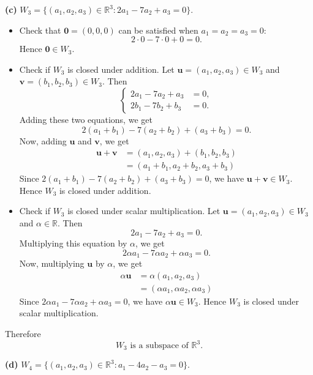 \documentclass{article}
\begin{document}
\bigskip

\noindent
\textbf{(c)} $W_3 = \{(a_1,a_2,a_3) \in \mathbb{R}^3 : 2a_1 - 7a_2 + a_3 = 0\}$.

\begin{itemize}
\item Check that $\mathbf{0} = (0,0,0)$ can be satisfied when $a_1 = a_2 = a_3 = 0$:
\[
2\cdot 0 - 7\cdot 0 + 0 = 0.
\]
Hence $\mathbf{0} \in W_3$.

\item Check if $W_3$ is closed under addition. Let $\mathbf{u} = (a_1,a_2,a_3) \in W_3$ and $\mathbf{v} = (b_1,b_2,b_3) \in W_3$. Then
\[
\left\{\begin{aligned}
2a_1 - 7a_2 + a_3 &= 0, \\
2b_1 - 7b_2 + b_3 &= 0.
\end{aligned}\right.
\]
Adding these two equations, we get
\[
2(a_1 + b_1) - 7(a_2 + b_2) + (a_3 + b_3) = 0.
\]
Now, adding $\mathbf{u}$ and $\mathbf{v}$, we get
\begin{align*}
\mathbf{u} + \mathbf{v} &= (a_1, a_2, a_3) + (b_1, b_2, b_3) \\
&= (a_1 + b_1, a_2 + b_2, a_3 + b_3)
\end{align*}
Since $2(a_1 + b_1) - 7(a_2 + b_2) + (a_3 + b_3) = 0$, we have $\mathbf{u} + \mathbf{v} \in W_3$. Hence $W_3$ is closed under addition.

\item Check if $W_3$ is closed under scalar multiplication. Let $\mathbf{u} = (a_1,a_2,a_3) \in W_3$ and $\alpha \in \mathbb{R}$. Then
\[
2a_1 - 7a_2 + a_3 = 0.
\]
Multiplying this equation by $\alpha$, we get
\[
2\alpha a_1 - 7\alpha a_2 + \alpha a_3 = 0.
\]
Now, multiplying $\mathbf{u}$ by $\alpha$, we get
\begin{align*}
\alpha \mathbf{u} &= \alpha (a_1, a_2, a_3) \\
&= (\alpha a_1, \alpha a_2, \alpha a_3)
\end{align*}
Since $2\alpha a_1 - 7\alpha a_2 + \alpha a_3 = 0$, we have $\alpha \mathbf{u} \in W_3$. Hence $W_3$ is closed under scalar multiplication.
\end{itemize}

Therefore
\[
\boxed{W_3 \text{ is a subspace of } \mathbb{R}^3.}
\]

\bigskip

\noindent
\textbf{(d)} $W_4 = \{(a_1,a_2,a_3) \in \mathbb{R}^3 : a_1 - 4a_2 - a_3 = 0\}$.
\end{document}
